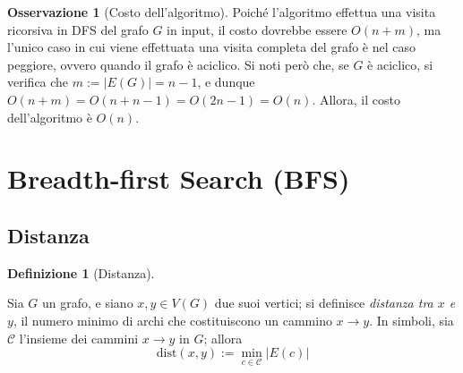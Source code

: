 \documentclass[14pt]{extreport}
\theoremstyle{definition}
\newtheorem{definition}{Definizione}[subsection]
\theoremstyle{definition}
\newtheorem{remark}{Osservazione}[subsection]
\begin{document}
\begin{remark}[Costo dell'algoritmo]
    Poiché l'algoritmo effettua una visita ricorsiva in DFS del grafo $G$ in input, il costo dovrebbe essere $O(n + m)$, ma l'unico caso in cui viene effettuata una visita completa del grafo è nel caso peggiore, ovvero quando il grafo è aciclico. Si noti però che, se $G$ è aciclico, si verifica che $m := |E(G)| = n - 1$, e dunque $O(n + m) = O(n + n - 1) = O(2n - 1) = O(n)$. Allora, il costo dell'algoritmo è $O(n)$.
\end{remark}

\section{Breadth-first Search (BFS)}

\subsection{Distanza}

\begin{definition}[Distanza]
    \label{distanza}

    Sia $G$ un grafo, e siano $x, y \in V(G)$ due suoi vertici; si definisce \textit{distanza tra $x$ e $y$}, il numero minimo di archi che costituiscono un cammino $x \rightarrow y$. In simboli, sia $\mathcal{C}$ l'insieme dei cammini $x \rightarrow y$ in $G$; allora $$\mathrm{dist}(x, y) := \min_{c \in \mathcal{C}}{\left |E(c) \right|}$$
\end{definition}
\end{document}
